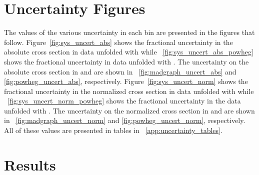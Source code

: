 \section{Uncertainty Figures}

The values of the various uncertainty in each \phistar bin are presented in the
figures that follow. Figure~\ref{fig:sys_uncert_abs} shows the fractional
uncertainty in the absolute \phistar cross section in data unfolded with
\MADGRAPH while \FIG~\ref{fig:sys_uncert_abs_powheg} shows the fractional
uncertainty in data unfolded with \POWHEG. The uncertainty on the absolute
\phistar cross section in \MADGRAPH and \POWHEG are shown in
\FIGS~\ref{fig:madgraph_uncert_abs} and \ref{fig:powheg_uncert_abs},
respectively. Figure~\ref{fig:sys_uncert_norm} shows the fractional uncertainty
in the normalized \phistar cross section in data unfolded with \MADGRAPH while
\FIG~\ref{fig:sys_uncert_norm_powheg} shows the fractional uncertainty in the
data unfolded with \POWHEG. The uncertainty on the normalized \phistar cross
section in \MADGRAPH and \POWHEG are shown in
\FIGS~\ref{fig:madgraph_uncert_norm} and \ref{fig:powheg_uncert_norm},
respectively. All of these values are presented in tables in
\APP~\ref{app:uncertainty_tables}.



















\section{Results}
\label{sec:results}

